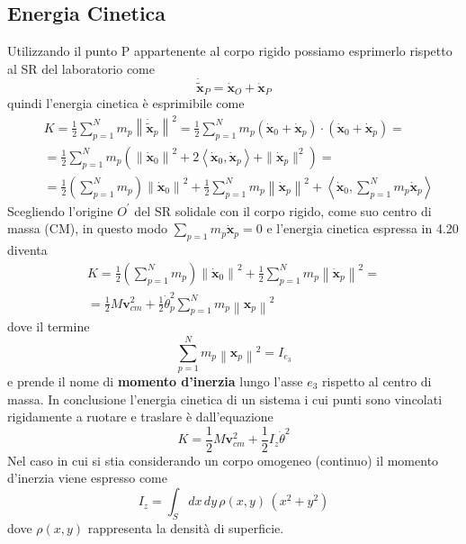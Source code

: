 \subsection{Energia Cinetica}
Utilizzando il punto P appartenente al corpo rigido possiamo esprimerlo rispetto al SR del laboratorio come 
\begin{equation}
	\bm{\dot{\tilde{x}}}_{P} = \bm{\dot{x}}_{O} + \bm{\dot{x}}_{P}
\end{equation}
quindi l'energia cinetica \`{e} esprimibile come 
\begin{equation}
\begin{aligned}
& K=\frac{1}{2} \sum_{p=1}^N m_p\left\|\bm{\dot{\tilde{x}}}_p\right\|^2= \frac{1}{2} \sum_{p=1}^N m_p\left(\dot{\bm{x}}_0+\dot{\bm{x}}_p\right) \cdot\left(\dot{\bm{x}}_0+\dot{\bm{x}}_p\right) = \\[0.2in]
& = \frac{1}{2} \sum_{p=1}^N m_p\left(\left\|\dot{\bm{x}}_0\right\|^2+2\left\langle\dot{\bm{x}}_0, \dot{\bm{x}}_p\right\rangle+\|\dot{\bm{x}}_ p\|^2\right) = \\[0.2in]
& = \frac{1}{2}\left(\sum_{p=1}^N m_p\right)\left\|\bm{\dot{x}}_0\right\|^2+\frac{1}{2} \sum_{p=1}^N m_p\left\|\dot{\bm{x}}_p\right\|^2+\left\langle\bm{\dot{x}}_0, \sum_{p=1}^N m_p \dot{\bm{x}}_p\right\rangle
\end{aligned}
\end{equation}
Scegliendo l'origine $O^{\prime}$ del SR solidale con il corpo rigido, come suo centro di massa (CM), in questo modo $\sum_{p=1}m_p \bm{\dot{x}}_p = 0$ e l'energia cinetica espressa in 4.20 diventa 
\begin{equation}
\begin{aligned}
	&K = \frac{1}{2}\left(\sum_{p=1}^N m_p\right)\left\|\bm{\dot{x}}_0\right\|^2+\frac{1}{2} \sum_{p=1}^N m_p\left\|\dot{\bm{x}}_p\right\|^2 = & \\[0.2in]
	&= \frac{1}{2}M\bm{v}_{cm}^2  + \frac{1}{2} \dot{\theta}^2_p\sum_{p=1}^N m_p\left\|\bm{x}_p\right\|^2
	\end{aligned}
\end{equation}
dove il termine 
\begin{equation}
	\sum_{p=1}^N m_p\left\|\bm{x}_p\right\|^2 = I_{e_{3}} 
\end{equation}
e prende il nome di \textbf{momento d'inerzia} lungo l'asse $e_{3}$ rispetto al centro di massa. In conclusione l'energia cinetica di un sistema i cui punti sono vincolati rigidamente a ruotare e traslare \`{e} dall'equazione
\begin{equation}
	\boxed{K = \frac{1}{2}M\bm{v}_{cm}^2 + \frac{1}{2}I_{z}\dot{\theta}^2}
\end{equation}
Nel caso in cui si stia considerando un corpo omogeneo (continuo) il momento d'inerzia viene espresso come 
\begin{equation}
	I_{z} = \int_{S} dx\,dy\,\rho(x,y)\, (x^2+y^2) 
\end{equation}
dove $\rho(x,y)$ rappresenta la densit\`{a} di superficie.


